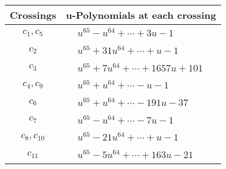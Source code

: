 \documentclass[1p]{elsarticle_modified}
\theoremstyle{definition}
\begin{document}
\begin{tabular}{m{50pt}|m{274pt}}
Crossings & \hspace{64pt}u-Polynomials at each crossing \\
\hline $$\begin{aligned}c_{1},c_{5}\end{aligned}$$&$\begin{aligned}
&u^{65}- u^{64}+\cdots+3 u-1
\end{aligned}$\\
\hline $$\begin{aligned}c_{2}\end{aligned}$$&$\begin{aligned}
&u^{65}+31 u^{64}+\cdots+u-1
\end{aligned}$\\
\hline $$\begin{aligned}c_{3}\end{aligned}$$&$\begin{aligned}
&u^{65}+7 u^{64}+\cdots+1657 u+101
\end{aligned}$\\
\hline $$\begin{aligned}c_{4},c_{9}\end{aligned}$$&$\begin{aligned}
&u^{65}+u^{64}+\cdots- u-1
\end{aligned}$\\
\hline $$\begin{aligned}c_{6}\end{aligned}$$&$\begin{aligned}
&u^{65}+u^{64}+\cdots-191 u-37
\end{aligned}$\\
\hline $$\begin{aligned}c_{7}\end{aligned}$$&$\begin{aligned}
&u^{65}- u^{64}+\cdots-7 u-1
\end{aligned}$\\
\hline $$\begin{aligned}c_{8},c_{10}\end{aligned}$$&$\begin{aligned}
&u^{65}-21 u^{64}+\cdots+u-1
\end{aligned}$\\
\hline $$\begin{aligned}c_{11}\end{aligned}$$&$\begin{aligned}
&u^{65}-5 u^{64}+\cdots+163 u-21
\end{aligned}$\\
\hline
\end{tabular}\newpage\renewcommand{\arraystretch}{1}
\end{document}
